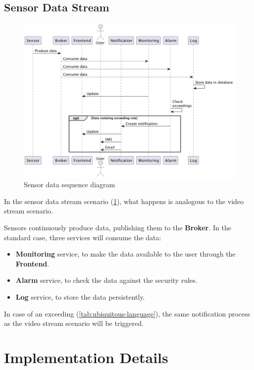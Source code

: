 \documentclass{scrartcl}
\begin{document}
    \subsection{Sensor Data Stream}
    \begin{figure}
        \centering
        \includegraphics[scale=0.5]{img/sensor-data-sequence}
        \caption{Sensor data sequence diagram}
        \label{fig:sensor-data-sequence}
    \end{figure}

    In the sensor data stream scenario (\cref{fig:sensor-data-sequence}), what happens is analogous to the video stream scenario.

    Sensors continuously produce data, publishing them to the \textbf{Broker}.
    In the standard case, three services will consume the data:

    \begin{itemize}
        \item \textbf{Monitoring} service, to make the data available to the user through the \textbf{Frontend}.
        \item \textbf{Alarm} service, to check the data against the security rules.
        \item \textbf{Log} service, to store the data persistently.
    \end{itemize}

    In case of an exceeding (\cref{tab:ubiquitous-language}), the same notification process as the video stream scenario will be triggered.

    \section{Implementation Details}
\end{document}
